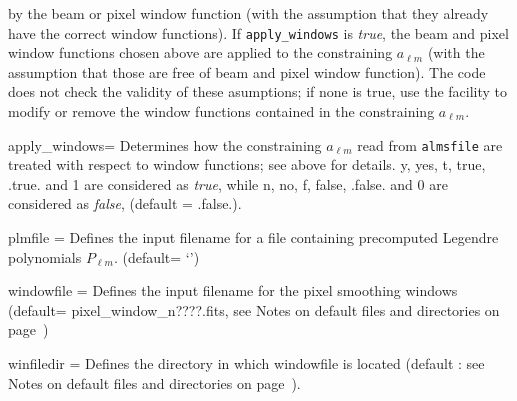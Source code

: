 \begin{qualifiers}
\begin{qulistwide}{}
by the beam or pixel window function (with the assumption that they already have the
    correct window functions). If {\tt apply\_windows} is {\em true}, the beam and
    pixel window functions chosen above are applied to the constraining $a_{\ell m}$ (with the
    assumption that those are free of beam and pixel window function). The code
    does not check the validity of these asumptions; if none is true, use the
     facility to modify or remove
    the window functions contained in the constraining $a_{\ell m}$.
%
     \item[{apply\_windows=}] Determines how the constraining $a_{\ell m}$  read from
     {\tt almsfile} are
     treated with respect to window functions; see above for details. 
     y, yes, t, true, .true. and 1 are considered as {\em true}, while n, no, f,
     false, .false. and 0 are considered as {\em false}, (default = .false.).
%
     \item[{plmfile = }] Defines the input  filename for a file
    containing  precomputed Legendre polynomials $P_{\ell m}$.
(default= `')
     \item[{windowfile = }] Defines the input filename  for the pixel
    smoothing windows 
(default= pixel\_window\_n????.fits, see Notes on default files and directories on page~\pageref{page:defdir})
     \item[{winfiledir = }] Defines the directory in which windowfile
    is located (default : see Notes on default files and directories on page~\pageref{page:defdir}).
  \end{qulistwide}
\end{qualifiers}

